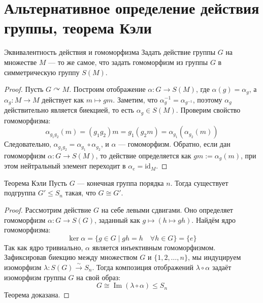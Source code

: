 \section{Альтернативное определение действия группы, теорема Кэли}

\begin{Statement}{Эквивалентность действия и гомоморфизма}{}
	Задать действие группы $G$ на множестве $M$ — то же самое, что задать гомоморфизм из группы $G$ в симметрическую группу $S(M)$.
\end{Statement}

\begin{proof}
	Пусть $G \curvearrowright M$. Построим отображение $\alpha \colon G \to S(M)$, где $\alpha(g) = \alpha_g$, а $\alpha_g \colon M \to M$ действует как $m \mapsto gm$.
	Заметим, что $\alpha_g^{-1} = \alpha_{g^{-1}}$, поэтому $\alpha_g$ действительно является биекцией, то есть $\alpha_g \in S(M)$.
	Проверим свойство гомоморфизма:
	\[ \alpha_{g_1 g_2}(m) = (g_1 g_2)m = g_1(g_2 m) = \alpha_{g_1}(\alpha_{g_2}(m)) \] 
	Следовательно, $\alpha_{g_1 g_2} = \alpha_{g_1} \circ \alpha_{g_2}$, и $\alpha$ — гомоморфизм.
	Обратно, если дан гомоморфизм $\alpha \colon G \to S(M)$, то действие определяется как $gm := \alpha_g(m)$, при этом нейтральный элемент переходит в $\alpha_e = \text{id}_M$.
\end{proof}

\begin{Theorem}{Теорема Кэли}{}
	Пусть $G$ — конечная группа порядка $n$. Тогда существует подгруппа $G' \le S_n$ такая, что $G \cong G'$.
\end{Theorem}

\begin{proof}
	Рассмотрим действие $G$ на себе левыми сдвигами. Оно определяет гомоморфизм $\alpha \colon G \to S(G)$, заданный как $g \mapsto (h \mapsto gh)$.
	Найдём ядро гомоморфизма:
	\[ \ker \alpha = \{g \in G \mid gh = h \quad \forall h \in G\} = \{e\} \] 
	Так как ядро тривиально, $\alpha$ является инъективным гомоморфизмом.
	Зафиксировав биекцию между множеством $G$ и $\{1, 2, \dots, n\}$, мы индуцируем изоморфизм $\lambda \colon S(G) \xrightarrow{\sim} S_n$.
	Тогда композиция отображений $\lambda \circ \alpha$ задаёт изоморфизм группы $G$ на свой образ:
	\[ G \cong \operatorname{Im}(\lambda \circ \alpha) \le S_n \] 
	Теорема доказана.
\end{proof}

